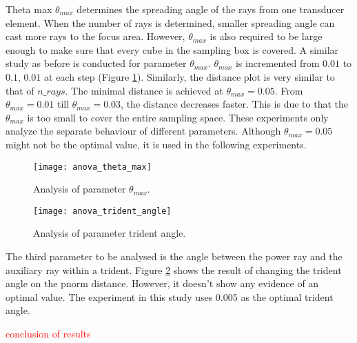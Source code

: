 Theta max $\theta_{max}$ determines the spreading angle of the rays from one transducer element. When the number of rays is determined, smaller spreading angle can cast more rays to the focus area. However, $\theta_{max}$ is also required to be large enough to make sure that every cube in the sampling box is covered. A similar study as before is conducted for parameter $\theta_{max}$. $\theta_{max}$ is incremented from $0.01$ to $0.1$, $0.01$ at each step (Figure \ref{fig:anova_theta_max}). Similarly, the distance plot is very similar to that of $n\_rays$. The minimal distance is achieved at $\theta_{max}=0.05$. From $\theta_{max}=0.01$ till $\theta_{max}=0.03$, the distance decreases faster. This is due to that the $\theta_{max}$ is too small to cover the entire sampling space. These experiments only analyze the separate behaviour of different parameters. Although $\theta_{max}=0.05$ might not be the optimal value, it is used in the following experiments.

\begin{figure}[h]
    \centering
    \texttt{[image: anova\_theta\_max]}
    \caption{Analysis of parameter $\theta_{max}$.}
    \label{fig:anova_theta_max}
\end{figure}

\begin{figure}[h]
    \centering
    \texttt{[image: anova\_trident\_angle]}
    \caption{Analysis of parameter trident angle.}
    \label{fig:anova_trident_angle}
\end{figure}

The third parameter to be analysed is the angle between the power ray and the auxiliary ray within a trident. Figure \ref{fig:anova_trident_angle} shows the result of changing the trident angle on the pnorm distance. However, it doesn't show any evidence of an optimal value. The experiment in this study uses 0.005 as the optimal trident angle.

\textcolor{red}{conclusion of results}
